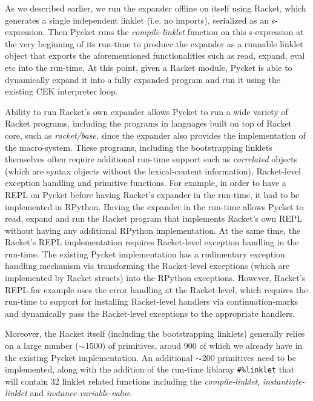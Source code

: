 As we described earlier, we run the expander offline on itself using
Racket, which generates a single independent linklet (i.e. no
imports), serialized as an s-expression. Then Pycket runs the
\emph{compile-linklet} function on this s-expression at the very
beginning of its run-time to produce the expander as a runnable
linklet object that exports the aforementioned functionalities such as
read, expand, eval etc into the run-time. At this point, given a
Racket module, Pycket is able to dynamically expand it into a fully
expanded program and run it using the existing CEK interpreter loop.

Ability to run Racket's own expander allows Pycket to run a wide
variety of Racket programs, including the programs in languages built
on top of Racket core, such as \emph{racket/base}, since the expander
also provides the implementation of the macro-system. These programs,
including the bootstrapping linklets themselves often require
additional run-time support such as \emph{correlated} objects (which
are syntax objects without the lexical-content information),
Racket-level exception handling and primitive functions. For example,
in order to have a REPL on Pycket before having Racket's expander in
the run-time, it had to be implemented in RPython. Having the expander
in the run-time allows Pycket to read, expand and run the Racket
program that implements Racket's own REPL without having any
additional RPython implementation. At the same time, the Racket's REPL
implementation requires Racket-level exception handling in the
run-time. The existing Pycket implementation has a rudimentary
exception handling mechanism via transforming the Racket-level
exceptions (which are implemented by Racket structs) into the RPython
exceptions. However, Racket's REPL for example uses the error handling
at the Racket-level, which requires the run-time to support for
installing Racket-level handlers via continuation-marks and
dynamically pass the Racket-level exceptions to the appropriate
handlers.

Moreover, the Racket itself (including the bootstrapping linklets)
generally relies on a large number ($\sim$1500) of primitives, aroud 900
of which we already have in the existing Pycket implementation. An
additional $\sim$200 primitives need to be implemented, along with the
addition of the run-time liblaray \texttt{\#\%linklet} that will
contain 32 linklet related functions including the
\emph{compile-linklet}, \emph{instantiate-linklet} and
\emph{instance-variable-value}.
